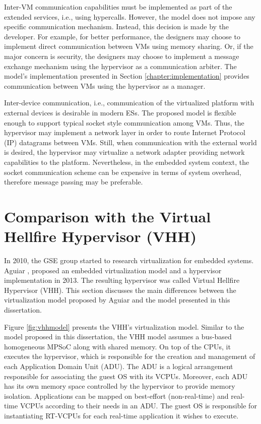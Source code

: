 Inter-VM communication capabilities must be implemented as part of the extended services, i.e., using hypercalls. However, the model does not impose any specific communication mechanism. Instead, this decision is made by the developer. For example, for better performance, the designers may choose to implement direct communication between VMs using memory sharing. Or, if the major concern is security, the designers may choose to implement a message exchange mechanism using the hypervisor as a communication arbiter. The model's implementation presented in Section \ref{chapter:implementation} provides communication between VMs using the hypervisor as a manager.  

Inter-device communication, i.e., communication of the virtualized platform with external devices is desirable in modern ESs. The proposed model is flexible enough to support typical socket style \cite{tanenbaum2011} communication among VMs. Thus, the hypervisor may implement a network layer in order to route Internet Protocol (IP)  datagrams \cite{tanenbaum2011} between VMs. Still, when communication with the external world is desired, the hypervisor may virtualize a network adapter providing network capabilities to the platform. Nevertheless, in the embedded system context, the socket communication scheme can be expensive in terms of system overhead, therefore message passing may be preferable.

\section{Comparison with the Virtual Hellfire Hypervisor (VHH)}
\label{section:vhh}

In 2010, the GSE group started to research virtualization for embedded systems. Aguiar \cite{aguiar2013}, proposed an embedded virtualization model and a hypervisor implementation in 2013. The resulting hypervisor was called Virtual Hellfire Hypervisor (VHH). This section discusses the main differences between the virtualization model proposed by Aguiar and the model presented in this dissertation. 

Figure \ref{fig:vhhmodel} presents the VHH's virtualization model. Similar to the model proposed in this dissertation, the VHH model assumes a bus-based homogeneous MPSoC along with shared memory. On top of the CPUs, it executes the hypervisor, which is responsible for the creation and management of each Application Domain Unit (ADU). The ADU is a logical arrangement responsible for associating the guest OS with its VCPUs. Moreover, each ADU has its own memory space controlled by the hypervisor to provide memory isolation. Applications can be mapped on best-effort (non-real-time) and real-time VCPUs according to their needs in an ADU. The guest OS is responsible for instantiating RT-VCPUs for each real-time application it wishes to execute.


